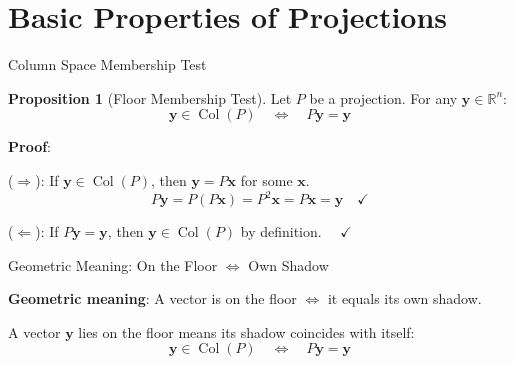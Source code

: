 \documentclass[10pt]{beamer}
\theoremstyle{definition}
\newtheorem{prop}{Proposition}[section]
\newcommand{\x}[1]{\alert{\textbf{#1}}}
\begin{document}
\section{Basic Properties of Projections}

\begin{frame}{Column Space Membership Test}

\begin{prop}[Floor Membership Test]
Let $P$ be a projection. For any $\mathbf{y} \in \mathbb{R}^n$:
$$\mathbf{y} \in \operatorname{Col}(P) \quad\iff\quad P\mathbf{y} = \mathbf{y}$$
\end{prop}

\textbf{Proof}:

($\Rightarrow$): If $\mathbf{y} \in \operatorname{Col}(P)$, then $\mathbf{y} = P\mathbf{x}$ for some $\mathbf{x}$.
$$P\mathbf{y} = P(P\mathbf{x}) = P^2\mathbf{x} = P\mathbf{x} = \mathbf{y} \quad\checkmark$$

($\Leftarrow$): If $P\mathbf{y} = \mathbf{y}$, then $\mathbf{y} \in \operatorname{Col}(P)$ by definition. $\quad\checkmark$

\end{frame}

\begin{frame}{Geometric Meaning: On the Floor $\iff$ Own Shadow}

\x{Geometric meaning}: A vector is on the floor $\iff$ it equals its own shadow.

\vspace{0.5em}

\begin{center}
\end{center}

\vspace{0.5em}

A vector $\mathbf{y}$ lies on the floor means its shadow coincides with itself:
$$\mathbf{y} \in \operatorname{Col}(P) \quad\iff\quad P\mathbf{y} = \mathbf{y}$$

\end{frame}
\end{document}
